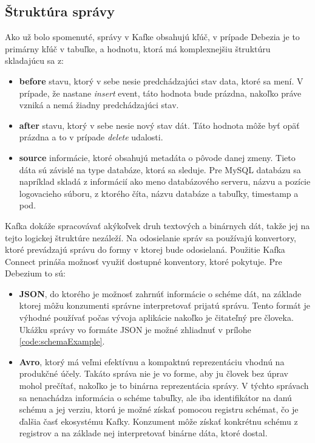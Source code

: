 \subsection{Štruktúra správy} \label{ssec:message_structure}
Ako už bolo spomenuté, správy v Kafke obsahujú kľúč, v prípade Debezia je to primárny kľúč v tabuľke, a hodnotu, ktorá má komplexnejšiu štruktúru skladajúcu sa z:
\begin{itemize}
\item \textbf{before} stavu, ktorý v sebe nesie predchádzajúci stav data, ktoré sa mení. V prípade, že nastane \textit{insert} event, táto hodnota bude prázdna, nakoľko práve vzniká a nemá žiadny predchádzajúci stav.
\item \textbf{after} stavu, ktorý v sebe nesie nový stav dát. Táto hodnota môže byť opäť prázdna a to v prípade \textit{delete} udalosti.
\item \textbf{source} informácie, ktoré  obsahujú metadáta o pôvode danej zmeny. Tieto dáta sú závislé na type databáze, ktorá sa sleduje. Pre MySQL databázu sa napríklad skladá z informácií ako meno databázového serveru, názvu a pozície logovacieho súboru, z ktorého číta, názvu databáze a tabuľky, timestamp a pod.
\end{itemize}

Kafka dokáže spracovávať akýkoľvek druh textových a binárnych dát, takže jej na tejto logickej štruktúre nezáleží. Na odosielanie správ sa používajú konvertory, ktoré prevádzajú správu do formy v ktorej bude odosielaná. Použitie Kafka Connect prináša možnosť využiť dostupné konventory, ktoré pokytuje. Pre Debezium to sú:

\begin{itemize}
\item \textbf{JSON}, do ktorého je možnosť zahrnúť informácie o schéme dát, na základe ktorej môžu konzumenti správne interpretovať prijatú správu. Tento formát je výhodné používať počas vývoja aplikácie nakoľko je čitateľný pre človeka. Ukážku správy vo formáte JSON je možné zhliadnuť v prílohe \ref{code:schemaExample}.
\item \textbf{Avro}, ktorý má veľmi efektívnu a kompaktnú reprezentáciu vhodnú na produkčné účely. Takáto správa nie je vo forme, aby ju človek bez úprav mohol prečítať, nakoľko je to binárna reprezentácia správy. V týchto správach sa nenachádza informácia o schéme tabuľky, ale iba identifikátor na danú schému a jej verziu, ktorú je možné získať pomocou registru schémat, čo je ďalšia časť ekosystému Kafky. Konzument môže získať konkrétnu schému z registrov a na základe nej interpretovať binárne dáta, ktoré dostal.
\end{itemize}

